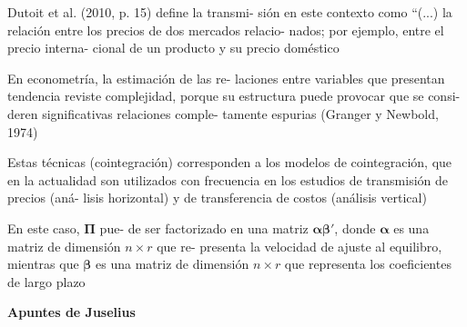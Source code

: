 \documentclass[12pt, twoside]{book}\usepackage[]{graphicx}\usepackage[]{color}
\numberwithin{equation}{section}
\numberwithin{theorem}{section}
\numberwithin{teorema}{section}
\numberwithin{defi}{section}
\numberwithin{prop}{section}
\numberwithin{defi}{section}
\theoremstyle{plain}
\begin{document}
Dutoit et al. (2010, p. 15) define la transmi-
sión en este contexto como “(...) la relación
entre los precios de dos mercados relacio-
nados; por ejemplo, entre el precio interna-
cional de un producto y su precio doméstico

En econometría, la estimación de las re-
laciones entre variables que presentan
tendencia reviste complejidad, porque su
estructura puede provocar que se consi-
deren significativas relaciones comple-
tamente espurias (Granger y Newbold,
1974)

Estas técnicas (cointegración) corresponden
a los modelos de cointegración, que en la
actualidad son utilizados con frecuencia en
los estudios de transmisión de precios (aná-
lisis horizontal) y de transferencia de costos
(análisis vertical)


En este caso, $\boldsymbol{\Pi}$ pue-
de ser factorizado en una matriz $\boldsymbol{\alpha\beta'}$, donde
$\boldsymbol{\alpha}$ es una matriz de dimensión $n \times r$ que re-
presenta la velocidad de ajuste al equilibro,
mientras que $\boldsymbol{\beta}$ es una matriz de dimensión
$n \times r$ que representa los coeficientes de largo
plazo


\textbf{Apuntes de Juselius}
\end{document}
